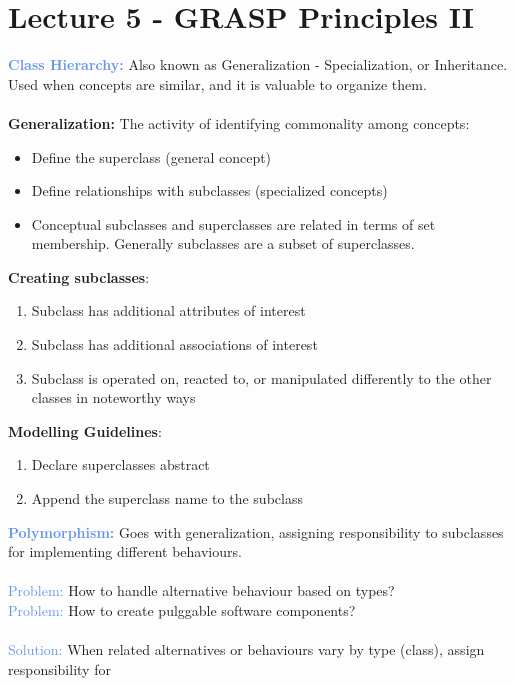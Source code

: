 \documentclass[a4paper,10pt]{article}
\begin{document}
\section*{Lecture 5 - GRASP Principles II}
\textcolor{CornflowerBlue}{\textbf{Class Hierarchy:}} Also known as Generalization - Specialization, or Inheritance. Used when concepts are similar, and it is valuable to organize them. \\\\
\indent \textbf{Generalization:} The activity of identifying commonality among concepts: 
\renewcommand{\labelitemi}{\textperiodcentered}
\begin{itemize}
\item Define the superclass (general concept)
\item Define relationships with subclasses (specialized concepts)
\item Conceptual subclasses and superclasses are related in terms of set membership. Generally subclasses are a subset of superclasses.
\end{itemize}
\indent \indent \textbf{Creating subclasses}: 
\begin{enumerate}
\item Subclass has additional attributes of interest 
\item Subclass has additional associations of interest 
\item Subclass is operated on, reacted to, or manipulated differently to the other classes in noteworthy ways 
\end{enumerate}
\indent \indent \textbf{Modelling Guidelines}: 
\begin{enumerate}
\item Declare superclasses abstract 
\item Append the superclass name to the subclass
\end{enumerate}
\textcolor{CornflowerBlue}{\textbf{Polymorphism:}} Goes with generalization, assigning responsibility to subclasses for implementing different behaviours. \\\\
\indent \textcolor{CornflowerBlue}{Problem:} How to handle alternative behaviour based on types? \\
\indent \textcolor{CornflowerBlue}{Problem:} How to create pulggable software components? \\\\
\indent \textcolor{CornflowerBlue}{Solution:} When related alternatives or behaviours vary by type (class), assign responsibility for \\
\end{document}
